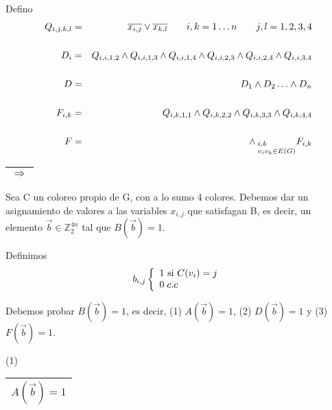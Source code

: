 \documentclass[12pt,a4paper]{report}
\begin{document}
		Defino
		\begin{eqnarray}
			Q_{i, j, k, l} &=& \overline{x_{i, j}} \vee \overline{x_{k, l}}  \qquad i, k = 1 \dotsc n \qquad j, l = 1, 2, 3, 4 \\
			\nonumber \\
			D_{i} &=& Q_{i, i, 1, 2} \wedge Q_{i, i, 1, 3} \wedge Q_{i, i, 1, 4} \wedge Q_{i, i, 2, 3} \wedge Q_{i, i, 2, 4} \wedge Q_{i, i, 3, 4} \\
			\nonumber \\
			D &=& D_{1} \wedge D_{2} \dotsc \wedge D_{n} \\
			\nonumber \\
			F_{i, k} &=& Q_{i, k, 1, 1} \wedge Q_{i, k, 2, 2} \wedge Q_{i, k, 3, 3} \wedge Q_{i, k, 4, 4} \\
			\nonumber \\
			F &=& \wedge_{\begin{subarray}{l} \; i, k \\ \; v_{i} v_{k} \in E(G) \end{subarray}} F_{i, k}
		\end{eqnarray}

		\begin{tabular}{|c|} \hline $\Rightarrow$ \\ \hline \end{tabular}
		\vspace{3mm}

		Sea C un coloreo propio de G, con a lo sumo 4 colores. Debemos dar un asignamiento de valores a las variables $x_{i, j}$ que satisfagan B, es decir, un elemento $\overrightarrow{b} \in \mathbb{Z}^{4n}_{2}$ tal que $B(\overrightarrow{b}) = 1$.

		\vspace{5mm}
		Definimos
		\begin{equation*}
			b_{i, j}
  			\left \lbrace
  			\begin{array}{l}
    		 1 \textup{ si } C(v_{i}) = j \\
     		 0 \; c.c \\
  			\end{array}
  			\right.
		\end{equation*}

		Debemos probar $B(\overrightarrow{b}) = 1$, es decir, (1) $A(\overrightarrow{b}) = 1$, (2) $D(\overrightarrow{b}) = 1$ y (3) $F(\overrightarrow{b}) = 1$.

		\vspace{3mm}
		(1) \begin{tabular}{|c|} \hline $A(\overrightarrow{b}) = 1$ \\ \hline \end{tabular}
\end{document}
